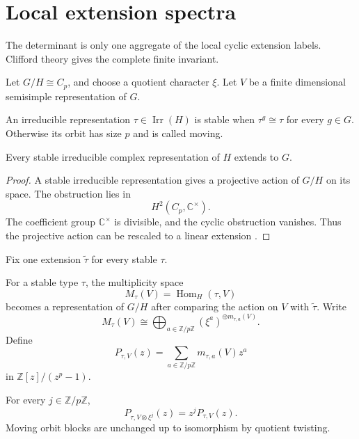 \documentclass{aomart}
\theoremstyle{definition}
\theoremstyle{remark}
\newcommand{\CC}{\mathbb C}
\newcommand{\ZZ}{\mathbb Z}
\newcommand{\Hom}{\operatorname{Hom}}
\newcommand{\Irr}{\operatorname{Irr}}
\begin{document}
\section{Local extension spectra}\label{sec:extension_spectra}

The determinant is only one aggregate of the local cyclic extension labels. Clifford theory gives the complete finite invariant.

Let \(G/H\cong C_p\), and choose a quotient character \(\xi\). Let \(V\) be a finite dimensional semisimple representation of \(G\).

\begin{definition}\label{def:stable_moving}
An irreducible representation \(\tau\in\Irr(H)\) is stable when \(\tau^g\cong\tau\) for every \(g\in G\). Otherwise its orbit has size \(p\) and is called moving.
\end{definition}

\begin{lemma}\label{lem:stable_extension}
Every stable irreducible complex representation of \(H\) extends to \(G\).
\end{lemma}

\begin{proof}
A stable irreducible representation gives a projective action of \(G/H\) on its space. The obstruction lies in
\[
 H^2(C_p,\CC^\times).
\]
The coefficient group \(\CC^\times\) is divisible, and the cyclic obstruction vanishes. Thus the projective action can be rescaled to a linear extension \cite{Brown1982,Isaacs1976}.
\end{proof}

Fix one extension \(\widetilde\tau\) for every stable \(\tau\).

\begin{definition}\label{def:extension_spectrum}
For a stable type \(\tau\), the multiplicity space
\[
 M_\tau(V)=\Hom_H(\tau,V)
\]
becomes a representation of \(G/H\) after comparing the action on \(V\) with \(\widetilde\tau\). Write
\[
 M_\tau(V)
 \cong
 \bigoplus_{a\in\ZZ/p\ZZ}
 (\xi^a)^{\oplus m_{\tau,a}(V)}.
\]
Define
\[
 \boxed{
 P_{\tau,V}(z)
 =
 \sum_{a\in\ZZ/p\ZZ}
 m_{\tau,a}(V)z^a
 }
\]
in \(\ZZ[z]/(z^p-1)\).
\end{definition}

\begin{proposition}\label{prop:spectrum_twist}
For every \(j\in\ZZ/p\ZZ\),
\[
 \boxed{
 P_{\tau,V\otimes\xi^j}(z)
 =
 z^jP_{\tau,V}(z).
 }
\]
Moving orbit blocks are unchanged up to isomorphism by quotient twisting.
\end{proposition}
\end{document}
